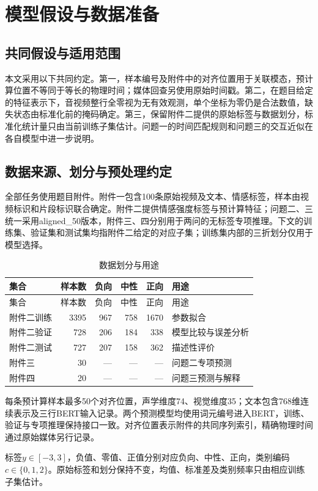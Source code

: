 \section{模型假设与数据准备}
\subsection{共同假设与适用范围}
本文采用以下共同约定。第一，样本编号及附件中的对齐位置用于关联模态，预计算位置不等同于等长的物理时间；媒体回查另使用原始时间戳。第二，在题目给定的特征表示下，音视频整行全零视为无有效观测，单个坐标为零仍是合法数值，缺失状态由标准化前的掩码确定。第三，保留附件二提供的原始标签与数据划分，标准化统计量只由当前训练子集估计。问题一的时间匹配规则和问题三的交互近似在各自模型中进一步说明。
\subsection{数据来源、划分与预处理约定}
全部任务使用题目附件。附件一包含100条原始视频及文本、情感标签，样本由视频标识和片段标识联合确定。附件二提供情感强度标签与预计算特征；问题二、三统一采用aligned\_50版本，附件三、四分别用于两问的无标签专项推理。下文的训练集、验证集和测试集均指附件二给定的对应子集；训练集内部的三折划分仅用于模型选择。

\begin{longtable}{lrrrrl}
\caption{数据划分与用途}\label{tab:data}\\
\toprule 集合 & 样本数 & 负向 & 中性 & 正向 & 用途\\\midrule\endfirsthead
\toprule 集合 & 样本数 & 负向 & 中性 & 正向 & 用途\\\midrule\endhead
附件二训练 &3395&967&758&1670&参数拟合\\
附件二验证 &728&206&184&338&模型比较与误差分析\\
附件二测试 &727&207&158&362&描述性评价\\
附件三 &30&—&—&—&问题二专项预测\\
附件四 &20&—&—&—&问题三预测与解释\\\bottomrule
\end{longtable}
每条预计算样本最多50个对齐位置，声学维度74、视觉维度35；文本包含768维连续表示及三行BERT输入记录。两个预测模型均使用词元编号进入BERT，训练、验证与专项推理保持接口一致。对齐位置表示附件的共同序列索引，精确物理时间通过原始媒体另行记录。

标签$y\in[-3,3]$，负值、零值、正值分别对应负向、中性、正向，类别编码$c\in\{0,1,2\}$。原始标签和划分保持不变，均值、标准差及类别频率只由相应训练子集估计。

